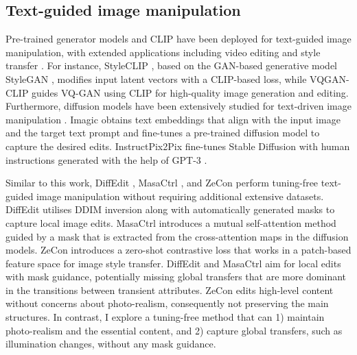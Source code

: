 \subsection{Text-guided image manipulation}
Pre-trained generator models and CLIP \cite{radford2021learning} have been deployed for text-guided image manipulation, with extended applications including video editing and style transfer \cite{bar2022text2live,gal2022stylegan,kwon2022clipstyler,liu2021fusedream,patashnik2021styleclip}. For instance, StyleCLIP \cite{patashnik2021styleclip}, based on the GAN-based generative model StyleGAN \cite{karras2020analyzing}, modifies input latent vectors with a CLIP-based loss, while VQGAN-CLIP \cite{crowson2022vqgan} guides VQ-GAN \cite{esser2021taming} using CLIP for high-quality image generation and editing. Furthermore, diffusion models have been extensively studied for text-driven image manipulation \cite{avrahami2022blended,gal2022image,kawar2023imagic,kim2022diffusionclip,liu2023more,meng2021sdedit,nichol2021glide,ruiz2023dreambooth}. Imagic \cite{kawar2023imagic} obtains text embeddings that align with the input image and the target text prompt and fine-tunes a pre-trained diffusion model to capture the desired edits. InstructPix2Pix \cite{brooks2023instructpix2pix} fine-tunes Stable Diffusion \cite{rombach2022high} with human instructions generated with the help of GPT-3 \cite{brown2020language}.

Similar to this work, DiffEdit \cite{couairon2022diffedit}, MasaCtrl \cite{cao2023masactrl}, and ZeCon \cite{yang2023zero} perform tuning-free text-guided image manipulation without requiring additional extensive datasets. DiffEdit \cite{couairon2022diffedit} utilises DDIM inversion \cite{dhariwal2021diffusion,song2020denoising} along with automatically generated masks to capture local image edits. MasaCtrl \cite{cao2023masactrl} introduces a mutual self-attention method guided by a mask that is extracted from the cross-attention maps in the diffusion models. ZeCon \cite{yang2023zero} introduces a zero-shot contrastive loss that works in a patch-based feature space for image style transfer. DiffEdit \cite{couairon2022diffedit} and MasaCtrl \cite{cao2023masactrl} aim for local edits with mask guidance, potentially missing global transfers that are more dominant in the transitions between transient attributes. ZeCon \cite{yang2023zero} edits high-level content without concerns about photo-realism, consequently not preserving the main structures. In contrast, I explore a tuning-free method that can 1) maintain photo-realism and the essential content, and 2) capture global transfers, such as illumination changes, without any mask guidance.

